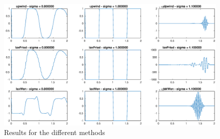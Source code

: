 \begin{figure}[!h]
\centering
\includegraphics[scale = 0.5]{./fig1.eps}
\caption{Results for the different methods}
\label{fig:1}
\end{figure}
